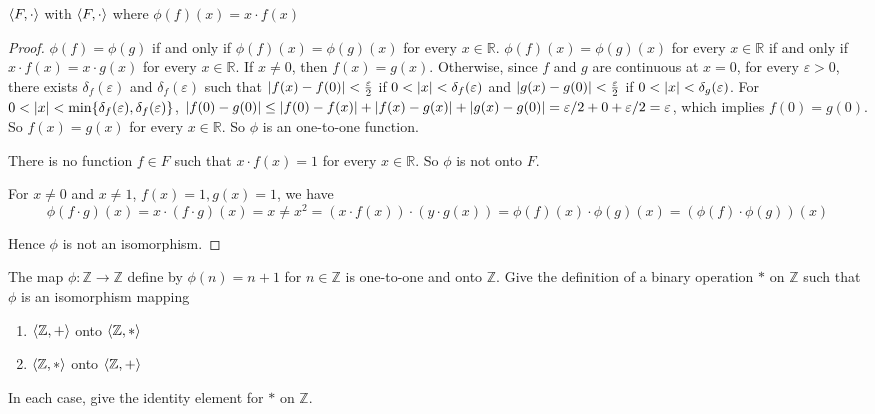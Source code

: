 \begin{exercise}
    $\left\langle{F,\cdot}\right\rangle$ with $\left\langle{F,\cdot}\right\rangle$ where $\phi(f)(x) = x\cdot f(x)$
\end{exercise}

\begin{proof}
    $\phi(f) = \phi(g)$ if and only if $\phi(f)(x) = \phi(g)(x)$ for every $x\in\mathbb{R}$. $\phi(f)(x) = \phi(g)(x)$ for every $x\in\mathbb{R}$ if and only if $x\cdot f(x) = x\cdot g(x)$ for every $x\in\mathbb{R}$. If $x\ne 0$, then $f(x) = g(x)$. Otherwise, since $f$ and $g$ are continuous at $x = 0$, for every $\varepsilon > 0$, there exists $\delta_{f}(\varepsilon)$ and $\delta_{f}(\varepsilon)$ such that $\left\vert{f(x) - f(0)}\right\vert < \frac{\varepsilon}{2}$ if $0 < \left\vert{x}\right\vert < \delta_{f}(\varepsilon)$ and $\left\vert{g(x) - g(0)}\right\vert < \frac{\varepsilon}{2}$ if $0 < \left\vert{x}\right\vert < \delta_{g}(\varepsilon)$. For $0 < \left\vert{x}\right\vert < \min\{ \delta_{f}(\varepsilon), \delta_{f}(\varepsilon) \}$, $\left\vert{f(0) - g(0)}\right\vert\le \left\vert{f(0) - f(x)}\right\vert + \left\vert{f(x) - g(x)}\right\vert + \left\vert{g(x) - g(0)}\right\vert = \varepsilon/2 + 0 + \varepsilon/2 = \varepsilon$, which implies $f(0) = g(0)$. So $f(x) = g(x)$ for every $x\in\mathbb{R}$. So $\phi$ is an one-to-one function.

    There is no function $f\in F$ such that $x\cdot f(x) = 1$ for every $x\in\mathbb{R}$. So $\phi$ is not onto $F$.

    For $x\ne 0$ and $x\ne 1$, $f(x) = 1, g(x) = 1$, we have
    \[
        \phi(f\cdot g)(x) = x\cdot (f\cdot g)(x) = x \ne x^{2} = (x\cdot f(x))\cdot (y\cdot g(x)) = \phi(f)(x) \cdot \phi(g)(x) = (\phi(f)\cdot\phi(g))(x)
    \]

    Hence $\phi$ is not an isomorphism.
\end{proof}

\begin{exercise}
    The map $\phi: \mathbb{Z} \to \mathbb{Z}$ define by $\phi(n) = n + 1$ for $n\in\mathbb{Z}$ is one-to-one and onto $\mathbb{Z}$. Give the definition of a binary operation $*$ on $\mathbb{Z}$ such that $\phi$ is an isomorphism mapping
    \begin{enumerate}[label={\textbf{\alph*}},itemsep=0pt,topsep=0pt]
        \item $\left\langle{\mathbb{Z}, +}\right\rangle$ onto $\left\langle{\mathbb{Z}, *}\right\rangle$
        \item $\left\langle{\mathbb{Z}, *}\right\rangle$ onto $\left\langle{\mathbb{Z}, +}\right\rangle$
    \end{enumerate}

    In each case, give the identity element for $*$ on $\mathbb{Z}$.
\end{exercise}

